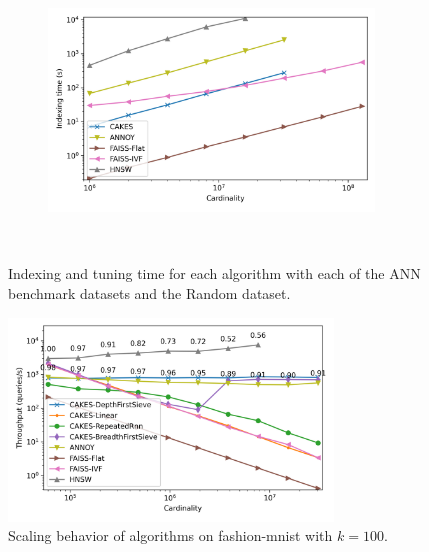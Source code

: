 \documentclass[review,supplement,onefignum,onetabnum]{siamonline220329}
\begin{document}
\begin{figure}
\begin{subfigure}[b]{0.47\textwidth}
        \label{fig:supplement:sift-indexing}
    \end{subfigure}%
    \begin{subfigure}[b]{0.47\textwidth}
        \includegraphics[width=0.95\textwidth]{plots/random-indexing.png}\\
        \label{fig:supplement:random-indexing}
    \end{subfigure}%
    \\
    \vspace{1em}
    \caption{Indexing and tuning time for each algorithm with each of the ANN benchmark datasets and the Random dataset.}
    \label{fig:supplement:indexing}
\end{figure}

\begin{figure}[ht!]
    \centering
    \includegraphics[width=3.4in]{plots/fashion-mnist-knn-100.png}
    \caption{
        Scaling behavior of algorithms on fashion-mnist with $k=100$. 
    }
    \label{fig:supplement:fashion-mnist-k-100}
\end{figure}
\end{document}
